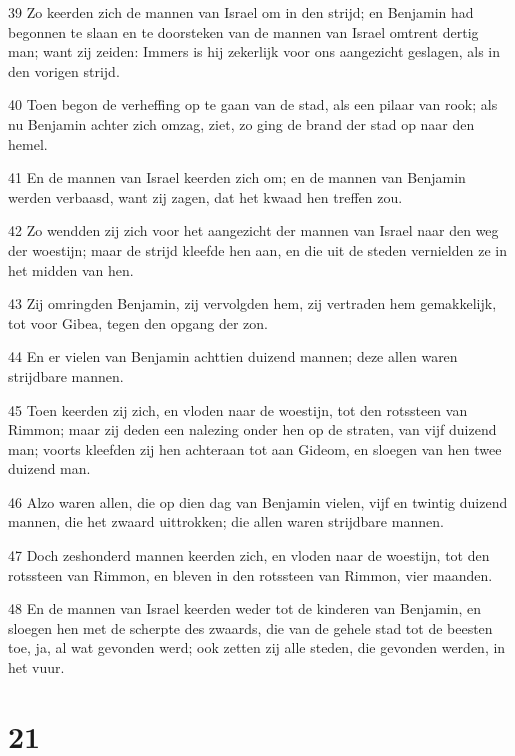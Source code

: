 \par 39 Zo keerden zich de mannen van Israel om in den strijd; en Benjamin had begonnen te slaan en te doorsteken van de mannen van Israel omtrent dertig man; want zij zeiden: Immers is hij zekerlijk voor ons aangezicht geslagen, als in den vorigen strijd.
\par 40 Toen begon de verheffing op te gaan van de stad, als een pilaar van rook; als nu Benjamin achter zich omzag, ziet, zo ging de brand der stad op naar den hemel.
\par 41 En de mannen van Israel keerden zich om; en de mannen van Benjamin werden verbaasd, want zij zagen, dat het kwaad hen treffen zou.
\par 42 Zo wendden zij zich voor het aangezicht der mannen van Israel naar den weg der woestijn; maar de strijd kleefde hen aan, en die uit de steden vernielden ze in het midden van hen.
\par 43 Zij omringden Benjamin, zij vervolgden hem, zij vertraden hem gemakkelijk, tot voor Gibea, tegen den opgang der zon.
\par 44 En er vielen van Benjamin achttien duizend mannen; deze allen waren strijdbare mannen.
\par 45 Toen keerden zij zich, en vloden naar de woestijn, tot den rotssteen van Rimmon; maar zij deden een nalezing onder hen op de straten, van vijf duizend man; voorts kleefden zij hen achteraan tot aan Gideom, en sloegen van hen twee duizend man.
\par 46 Alzo waren allen, die op dien dag van Benjamin vielen, vijf en twintig duizend mannen, die het zwaard uittrokken; die allen waren strijdbare mannen.
\par 47 Doch zeshonderd mannen keerden zich, en vloden naar de woestijn, tot den rotssteen van Rimmon, en bleven in den rotssteen van Rimmon, vier maanden.
\par 48 En de mannen van Israel keerden weder tot de kinderen van Benjamin, en sloegen hen met de scherpte des zwaards, die van de gehele stad tot de beesten toe, ja, al wat gevonden werd; ook zetten zij alle steden, die gevonden werden, in het vuur.

\chapter{21}

